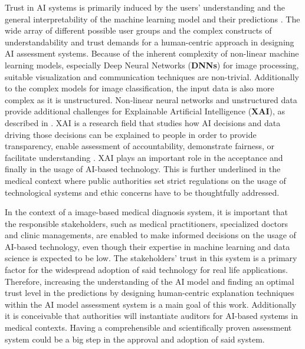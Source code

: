 \documentclass[11pt,a4paper,english]{scrreprt}
\begin{document}
Trust in AI systems is primarily induced by the users' understanding and the general interpretability of the machine learning model and their predictions \parencite{ribeiro_why_2016, ras_explanation_2018}. The wide array of different possible user groups and the complex constructs of understandability and trust demands for a human-centric approach in designing AI assessment systems. Because of the inherent complexity of non-linear machine learning models, especially Deep Neural Networks (\textbf{DNNs}) for image processing, suitable visualization and communication techniques are non-trivial. Additionally to the complex models for image classification, the input data is also more complex as it is unstructured. Non-linear neural networks and unstructured data provide additional challenges for Explainable Artificial Intelligence (\textbf{XAI}), as described in \textcite{keane_how_2019}. XAI is a research field that studies how AI decisions and data driving those decisions can be explained to people in order to provide transparency, enable assessment of accountability, demonstrate fairness, or facilitate understanding \parencite{arrieta_explainable_2019}. XAI plays an important role in the acceptance and finally in the usage of AI-based technology. This is further underlined in the medical context where public authorities set strict regulations on the usage of technological systems and ethic concerns have to be thoughtfully addressed.

In the context of a image-based medical diagnosis system, it is important that the responsible stakeholders, such as medical practitioners, specialized doctors and clinic managements, are enabled to make informed decisions on the usage of AI-based technology, even though their expertise in machine learning and data science is expected to be low. The stakeholders' trust in this system is a primary factor for the widespread adoption of said technology for real life applications. Therefore, increasing the understanding of the AI model and finding an optimal trust level in the predictions by designing human-centric explanation techniques within the AI model assessment system is a main goal of this work. Additionally it is conceivable that authorities will instantiate auditors for AI-based systems in medical contexts. Having a comprehensible and scientifically proven assessment system could be a big step in the approval and adoption of said system. 
\end{document}
